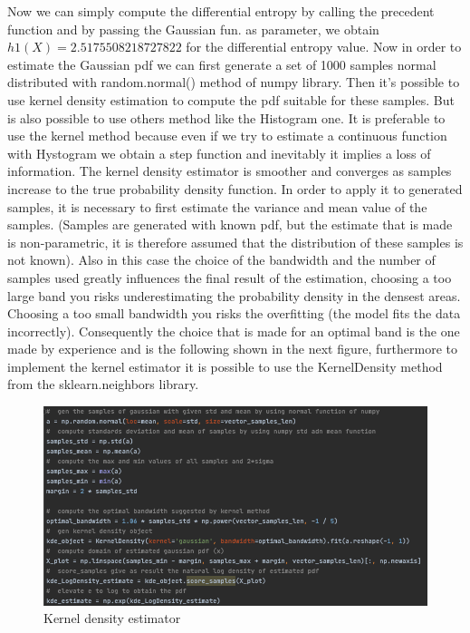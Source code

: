 \documentclass[12pt]{report}
\begin{document}
Now we can simply compute the differential entropy by calling the precedent function and by passing the Gaussian fun. as parameter, we obtain $h1(X) = 2.5175508218727822$ for the differential entropy value. Now in 
order to estimate the Gaussian pdf we can first generate a set of 1000 samples normal distributed with random.normal() method of numpy library. Then it's possible to use kernel density estimation to compute the pdf 
suitable for these samples. But is also possible to use others method like the Histogram one. It is preferable to use the kernel method because even if we try to estimate a continuous function with Hystogram
we obtain a step function and inevitably it implies a loss of information. The kernel density estimator is smoother and converges as samples increase to the true probability density function. In order to apply it to 
generated samples, it is necessary to first estimate the variance and mean value of the samples. (Samples are generated with known pdf, but the estimate that is made is non-parametric, it is therefore assumed that the distribution of these samples is not known). Also in this case the choice of the bandwidth and the number of samples used greatly influences the final result of the estimation, choosing a too large band you risks underestimating the probability density in the densest areas. Choosing a too small  bandwidth you risks the overfitting (the model fits the data incorrectly). Consequently the choice that is made for an optimal band is the one made by experience and is the following shown in the next figure, furthermore to implement the kernel estimator it is possible to use the KernelDensity method from the sklearn.neighbors library.

\begin{figure}[h!]
    \centering
    \includegraphics[width=16cm]{Pictures/pdf kernel estimator.png}
    \caption{Kernel density estimator}
\end{figure}
\end{document}
